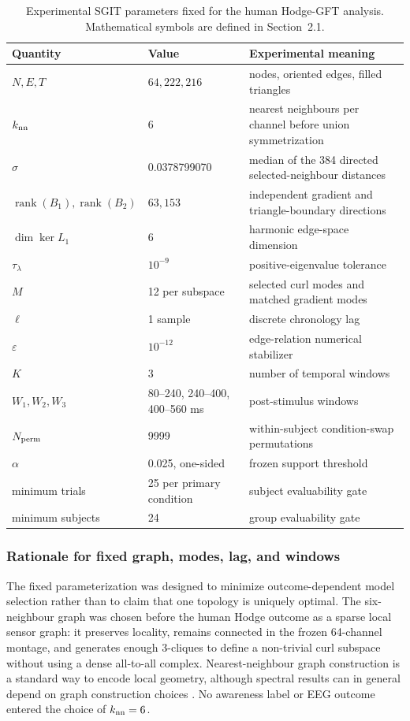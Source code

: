 \documentclass[12pt]{article}
\newcommand{\rankop}{\operatorname{rank}}
\begin{document}
\begin{table}[t]
\centering\small
\caption{Experimental SGIT parameters fixed for the human Hodge-GFT analysis. Mathematical symbols are defined in Section~2.1.}
\begin{tabularx}{\textwidth}{@{}l l X@{}}
\toprule
Quantity & Value & Experimental meaning\\
\midrule
$N,E,T$ & $64,222,216$ & nodes, oriented edges, filled triangles\\
${k_{\rm nn}}$ & 6 & nearest neighbours per channel before union symmetrization\\
$\sigma$ & 0.0378799070 & median of the 384 directed selected-neighbour distances\\
$\rankop(B_1),\rankop(B_2)$ & $63,153$ & independent gradient and triangle-boundary directions\\
$\dim\ker L_1$ & 6 & harmonic edge-space dimension\\
$\tau_\lambda$ & $10^{-9}$ & positive-eigenvalue tolerance\\
$M$ & 12 per subspace & selected curl modes and matched gradient modes\\
$\ell$ & 1 sample & discrete chronology lag\\
$\varepsilon$ & $10^{-12}$ & edge-relation numerical stabilizer\\
$K$ & 3 & number of temporal windows\\
$W_1,W_2,W_3$ & 80--240, 240--400, 400--560 ms & post-stimulus windows\\
$N_{\rm perm}$ & 9999 & within-subject condition-swap permutations\\
$\alpha$ & 0.025, one-sided & frozen support threshold\\
minimum trials & 25 per primary condition & subject evaluability gate\\
minimum subjects & 24 & group evaluability gate\\
\bottomrule
\end{tabularx}
\label{tab:experimental_parameters}
\end{table}

\subsubsection{Rationale for fixed graph, modes, lag, and windows}
The fixed parameterization was designed to minimize outcome-dependent model selection rather than to claim that one topology is uniquely optimal. The six-neighbour graph was chosen before the human Hodge outcome as a sparse local sensor graph: it preserves locality, remains connected in the frozen 64-channel montage, and generates enough 3-cliques to define a non-trivial curl subspace without using a dense all-to-all complex. Nearest-neighbour graph construction is a standard way to encode local geometry, although spectral results can in general depend on graph construction choices \citep{vonLuxburg2007}. No awareness label or EEG outcome entered the choice of $k_{\rm nn}=6$.
\end{document}
